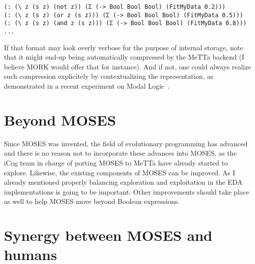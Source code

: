 \documentclass[]{report}
\begin{document}
{\small
\begin{verbatim}
(: (\ z (s z) (not z)) (Σ (-> Bool Bool Bool) (FitMyData 0.2)))
(: (\ z (s z) (or z (s z))) (Σ (-> Bool Bool Bool) (FitMyData 0.5)))
(: (\ z (s z) (and z (s z))) (Σ (-> Bool Bool Bool) (FitMyData 0.8)))
...
\end{verbatim}
} If that format may look overly verbose for the purpose of internal
storage, note that it might end-up being automatically compressed by
the MeTTa backend (I believe MORK would offer that for instance).  And
if not, one could always realize such compression explicitely by
contextualizing the representation, as demonstrated in a recent
experiment on Modal Logic~\cite{ModalLogic}.

\section{Beyond MOSES}

Since MOSES was invented, the field of evolutionary programming has
advanced and there is no reason not to incorporate these advances into
MOSES, as the iCog team in charge of porting MOSES to MeTTa have
already started to explore.  Likewise, the existing components of
MOSES can be improved.  As I already mentioned properly balancing
exploration and exploitation in the EDA implementations is going to be
important.  Other improvements should take place as well to help MOSES
move beyond Boolean expressions.

\section{Synergy between MOSES and humans}




\end{document}
